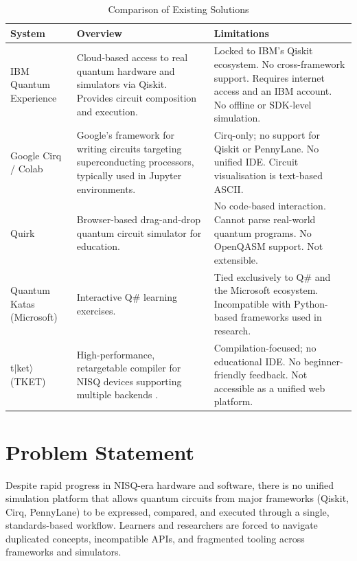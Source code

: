 \begin{table}[H]
\centering
\caption{Comparison of Existing Solutions}
\label{tab:existing-solutions}
\begin{tabular}{>{\raggedright\arraybackslash}p{2.6cm} >{\raggedright\arraybackslash}p{5.3cm} >{\raggedright\arraybackslash}p{5.3cm}}
\toprule
\textbf{System} & \textbf{Overview} & \textbf{Limitations} \\
\midrule
IBM Quantum Experience & Cloud-based access to real quantum hardware and simulators via Qiskit. Provides circuit composition and execution. & Locked to IBM's Qiskit ecosystem. No cross-framework support. Requires internet access and an IBM account. No offline or SDK-level simulation. \\
Google Cirq / Colab & Google's framework for writing circuits targeting superconducting processors, typically used in Jupyter environments. & Cirq-only; no support for Qiskit or PennyLane. No unified IDE. Circuit visualisation is text-based ASCII. \\
Quirk & Browser-based drag-and-drop quantum circuit simulator for education. & No code-based interaction. Cannot parse real-world quantum programs. No OpenQASM support. Not extensible. \\
Quantum Katas (Microsoft) & Interactive Q\# learning exercises. & Tied exclusively to Q\# and the Microsoft ecosystem. Incompatible with Python-based frameworks used in research. \\
t$|$ket$\rangle$ (TKET) & High-performance, retargetable compiler for NISQ devices supporting multiple backends \cite{sivarajah2020tket}. & Compilation-focused; no educational IDE. No beginner-friendly feedback. Not accessible as a unified web platform. \\
\bottomrule
\end{tabular}
\end{table}

\section{Problem Statement}

Despite rapid progress in NISQ-era hardware and software, there is no unified simulation platform that allows quantum circuits from major frameworks (Qiskit, Cirq, PennyLane) to be expressed, compared, and executed through a single, standards-based workflow. Learners and researchers are forced to navigate duplicated concepts, incompatible APIs, and fragmented tooling across frameworks and simulators.

